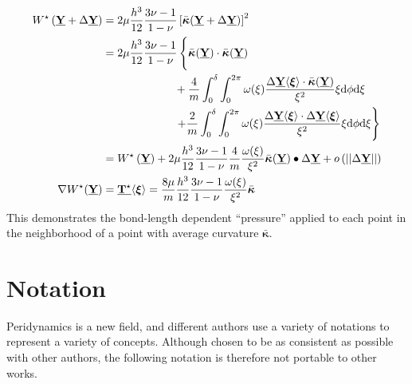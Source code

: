 \begin{align}
    W^\star\left(\vstate{Y}{}{}+\Delta\vstate{Y}{}{}\right) &=2\mu\frac{h^3}{12}\frac{3\nu-1}{1-\nu}\left[\bar{\boldsymbol{\kappa}}\!\left(\vstate{Y}{}{}+\Delta\vstate{Y}{}{}\right)\right]^2 \notag \\
    &=2\mu\frac{h^3}{12}\frac{3\nu-1}{1-\nu} \left\{ \vphantom{\int_0^\delta} \bar{\boldsymbol{\kappa}}\!\left(\vstate{Y}{}{}\right) \cdot \bar{\boldsymbol{\kappa}}\!\left(\vstate{Y}{}{}\right)\right. \notag \\
    &\phantom{=2\mu\frac{h^3}{12}\frac{3\nu-1}{1-\nu}} + \frac{4}{m} \int_0^\delta \int_0^{2\pi}\omega(\xi)\frac{\Delta\vstate{Y}{}{\boldsymbol{\xi}}\cdot \bar{\boldsymbol{\kappa}}\!\left(\vstate{Y}{}{}\right)}{\xi^2} \xi {\rm d}\phi {\rm d}\xi \notag \\
    &\phantom{=2\mu\frac{h^3}{12}\frac{3\nu-1}{1-\nu}}\left. + \frac{2}{m} \int_0^\delta \int_0^{2\pi}\omega(\xi)\frac{\Delta\vstate{Y}{}{\boldsymbol{\xi}}\cdot \Delta\vstate{Y}{}{\boldsymbol{\xi}}}{\xi^2} \xi {\rm d}\phi {\rm d}\xi\right\} \notag \\
    &=W^\star\left(\vstate{Y}{}{}\right)+ 2\mu\frac{h^3}{12}\frac{3\nu-1}{1-\nu} \frac{4}{m} \frac{\omega(\xi)}{\xi^2} \bar{\boldsymbol{\kappa}}\!\left(\vstate{Y}{}{}\right) \bullet \Delta\vstate{Y}{}{} + o\left(||\Delta\vstate{Y}{}{}||\right)\notag \\
    \nabla W^\star\!\left(\vstate{Y}{}{}\right) &= \vstate{T^\star}{}{\boldsymbol{\xi}} =  \frac{8 \mu}{m} \frac{h^3}{12}\frac{3\nu-1}{1-\nu}\frac{\omega(\xi)}{\xi^2} \bar{\boldsymbol{\kappa}}\notag
\end{align}
%
This demonstrates the bond-length dependent ``pressure'' applied to each point in the neighborhood of a point with average curvature $\bar{\boldsymbol{\kappa}}$.




\chapter{Notation}

Peridynamics is a new field, and different authors use a variety of notations to represent a variety of concepts.
Although chosen to be as consistent as possible with other authors, the following notation is therefore not portable to other works.


